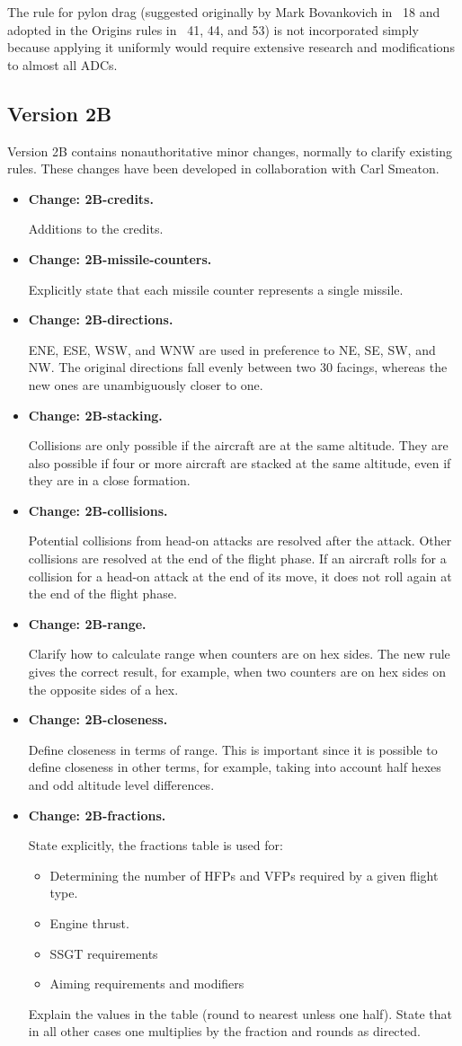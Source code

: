 \documentclass[10pt]{report}
\newcommand{\itemtag}[1]{\item \textbf{Change: #1.}\par}
\begin{document}
The rule for pylon drag (suggested originally by Mark Bovankovich in {\APJ}~18 and adopted in the Origins rules in {\APJ}~41, 44, and 53) is not incorporated simply because applying it uniformly would require extensive research and modifications to almost all ADCs.

\subsection{Version 2B}

Version 2B contains nonauthoritative minor changes, normally to clarify existing rules. These changes have been developed in collaboration with Carl Smeaton.

\begin{itemize}
    \itemtag{2B-credits} Additions to the credits.
    
    \itemtag{2B-missile-counters} Explicitly state that each missile counter represents a single missile.

    \itemtag{2B-directions} ENE, ESE, WSW, and WNW are used in preference to NE, SE, SW, and NW. The original directions fall evenly between two 30{\deg} facings, whereas the new  ones are unambiguously closer to one.

    \itemtag{2B-stacking} Collisions are only possible if the aircraft are at the same altitude. They are also possible if four or more aircraft are stacked at the same altitude, even if they are in a close formation.

    \itemtag{2B-collisions} Potential collisions from head-on attacks are resolved after the attack. Other collisions are resolved at the end of the flight phase. If an aircraft rolls for a collision for a head-on attack at the end of its move, it does not roll again at the end of the flight phase.

    \itemtag{2B-range} Clarify how to calculate range when counters are on hex sides. The new rule gives the correct result, for example, when two counters are on hex sides on the opposite sides of a hex.
    
    \itemtag{2B-closeness} Define closeness in terms of range. This is important since it is possible to define closeness in other terms, for example, taking into account half hexes and odd altitude level differences.

    \itemtag{2B-fractions} State explicitly, the fractions table is used for:
    \begin{itemize}
        \item Determining the number of HFPs and VFPs required by a given flight type.
        \item Engine thrust.
        \item SSGT requirements
        \item Aiming requirements and modifiers
    \end{itemize}
    Explain the values in the table (round to nearest unless one half). State that in all other cases one multiplies by the fraction and rounds as directed.


\end{itemize}
\end{document}
